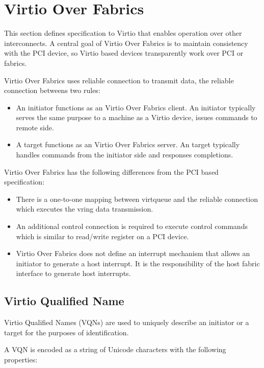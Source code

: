 \section{Virtio Over Fabrics}\label{sec:Virtio Transport Options / Virtio Over Fabrics}

This section defines specification to Virtio that enables operation over other
interconnects. A central goal of Virtio Over Fabrics is to maintain consistency
with the PCI device, so Virtio based devices transparently work over PCI or
fabrics.

Virtio Over Fabrics uses reliable connection to transmit data, the reliable
connection betweens two rules:

\begin{itemize}
\item An initiator functions as an Virtio Over Fabrics client. An initiator
typically serves the same purpose to a machine as a Virtio device, issues
commands to remote side.
\item A target functions as an Virtio Over Fabrics server. An target typically
handles commands from the initiator side and responses completions.
\end{itemize}

Virtio Over Fabrics has the following differences from the PCI based
specification:

\begin{itemize}
\item There is a one-to-one mapping between virtqueue and the reliable
connection which executes the vring data transmission.
\item An additional control connection is required to execute control commands
which is similar to read/write register on a PCI device.
\item Virtio Over Fabrics does not define an interrupt mechanism that allows an
initiator to generate a host interrupt. It is the responsibility of the host
fabric interface to generate host interrupts.
\end{itemize}

\subsection{Virtio Qualified Name}\label{sec:Virtio Transport Options / Virtio Over Fabrics / Virtio Qualified Name}
Virtio Qualified Names (VQNs) are used to uniquely describe an initiator or a
target for the purposes of identification.

A VQN is encoded as a string of Unicode characters with the following
properties:


